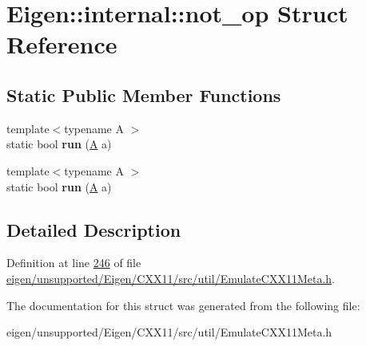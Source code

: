 \hypertarget{struct_eigen_1_1internal_1_1not__op}{}\section{Eigen\+:\+:internal\+:\+:not\+\_\+op Struct Reference}
\label{struct_eigen_1_1internal_1_1not__op}
\subsection*{Static Public Member Functions}
\begin{DoxyCompactItemize}
\item 
\mbox{\label{struct_eigen_1_1internal_1_1not__op_a48d0b366f01066c4681c1edf4893dd6c}} 
{\footnotesize template$<$typename A $>$ }\\static bool {\bfseries run} (\hyperlink{group___core___module_class_eigen_1_1_matrix}{A} a)
\item 
\mbox{\label{struct_eigen_1_1internal_1_1not__op_a48d0b366f01066c4681c1edf4893dd6c}} 
{\footnotesize template$<$typename A $>$ }\\static bool {\bfseries run} (\hyperlink{group___core___module_class_eigen_1_1_matrix}{A} a)
\end{DoxyCompactItemize}


\subsection{Detailed Description}


Definition at line \hyperlink{eigen_2unsupported_2_eigen_2_c_x_x11_2src_2util_2_emulate_c_x_x11_meta_8h_source_l00246}{246} of file \hyperlink{eigen_2unsupported_2_eigen_2_c_x_x11_2src_2util_2_emulate_c_x_x11_meta_8h_source}{eigen/unsupported/\+Eigen/\+C\+X\+X11/src/util/\+Emulate\+C\+X\+X11\+Meta.\+h}.



The documentation for this struct was generated from the following file\+:\begin{DoxyCompactItemize}
\item 
eigen/unsupported/\+Eigen/\+C\+X\+X11/src/util/\+Emulate\+C\+X\+X11\+Meta.\+h\end{DoxyCompactItemize}
